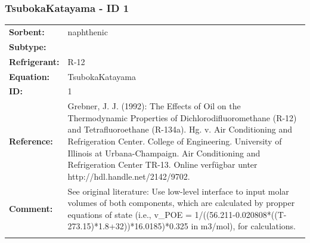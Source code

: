 \subsubsection{TsubokaKatayama - ID 1}
%
\begin{tabular}[l]{|lp{11.5cm}|}
\hline
\addlinespace

\textbf{Sorbent:} & naphthenic \\
\textbf{Subtype:} &  \\
\textbf{Refrigerant:} & R-12 \\
\textbf{Equation:} & TsubokaKatayama \\
\textbf{ID:} & 1 \\
\textbf{Reference:} & Grebner, J. J. (1992): The Effects of Oil on the Thermodynamic Properties of Dichlorodifluoromethane (R-12) and Tetrafluoroethane (R-134a). Hg. v. Air Conditioning and Refrigeration Center. College of Engineering. University of Illinois at Urbana-Champaign. Air Conditioning and Refrigeration Center TR-13. Online verfügbar unter http://hdl.handle.net/2142/9702. \\
\textbf{Comment:} & See original literature: Use low-level interface to input molar volumes of both components, which are calculated by propper equations of state (i.e., v\_POE =  1/((56.211-0.020808*((T-273.15)*1.8+32))*16.0185)*0.325 in m3/mol), for calculations. \\

\addlinespace
\hline
\end{tabular}
\newline

